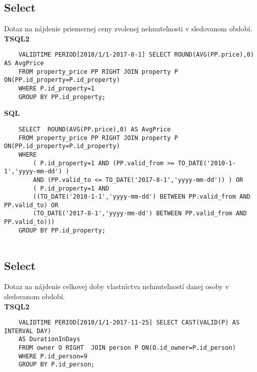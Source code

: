 \documentclass[11pt, a4paper]{article}
\begin{document}
\subsection{Select}
Dotaz na nájdenie priemernej ceny zvolenej nehnuteľnosti v sledovanom období.\\

\textbf{TSQL2}

\begin{center}
\begin{verbatim}
    VALIDTIME PERIOD[2010/1/1-2017-8-1] SELECT ROUND(AVG(PP.price),0) AS AvgPrice
    FROM property_price PP RIGHT JOIN property P ON(PP.id_property=P.id_property)  
    WHERE P.id_property=1
    GROUP BY PP.id_property;
\end{verbatim}
\end{center}

\textbf{SQL}
\begin{center}
\begin{verbatim}
    SELECT  ROUND(AVG(PP.price),0) AS AvgPrice
    FROM property_price PP RIGHT JOIN property P ON(PP.id_property=P.id_property)  
    WHERE 
        ( P.id_property=1 AND (PP.valid_from >= TO_DATE('2010-1-1','yyyy-mm-dd') ) 
        AND (PP.valid_to <= TO_DATE('2017-8-1','yyyy-mm-dd')) ) OR
        ( P.id_property=1 AND 
        ((TO_DATE('2010-1-1','yyyy-mm-dd') BETWEEN PP.valid_from AND PP.valid_to) OR
        (TO_DATE('2017-8-1','yyyy-mm-dd') BETWEEN PP.valid_from AND PP.valid_to)))
    GROUP BY PP.id_property;


\end{verbatim}
\end{center}
\newpage
\subsection{Select}
Dotaz na nájdenie celkovej doby vlastníctva nehnuteľností danej osoby v sledovanom období.\\

\textbf{TSQL2}

\begin{center}
\begin{verbatim}
    VALIDTIME PERIOD[2010/1/1-2017-11-25] SELECT CAST(VALID(P) AS INTERVAL DAY) 
    AS DurationInDays
    FROM owner O RIGHT  JOIN person P ON(O.id_owner=P.id_person)
    WHERE P.id_person=9
    GROUP BY P.id_person;
\end{verbatim}
\end{center}
\end{document}
